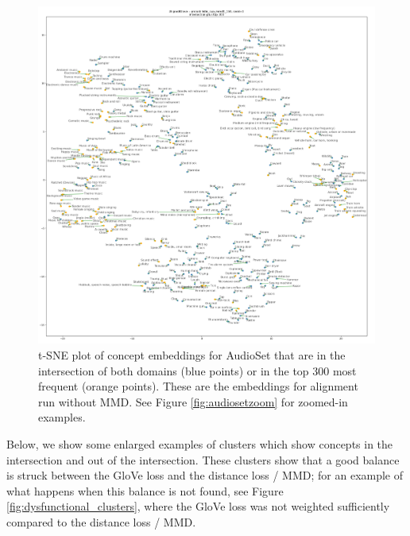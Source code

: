 \begin{figure}[H]
    \centering
    \includegraphics[width=\textwidth]{images/results/intersection_top300_tsne_audioset_probabilistic_sup_mmd0_150_AlignedGlove_1.png}
    \caption{
        t-SNE plot of concept embeddings for AudioSet that are in the intersection of both domains (blue points) or in the top 300 most frequent (orange points). These are the embeddings for alignment run without MMD. See Figure \ref{fig:audiosetzoom} for zoomed-in examples. 
    }
\end{figure}

Below, we show some enlarged examples of clusters which show concepts in the intersection and out of the intersection. These clusters show that a good balance is struck between the GloVe loss and the distance loss / MMD; for an example of what happens when this balance is not found, see Figure \ref{fig:dysfunctional_clusters}, where the GloVe loss was not weighted sufficiently compared to the distance loss / MMD. 



